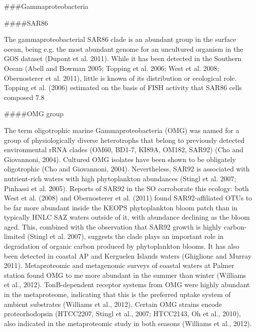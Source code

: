 ###Gammaproteobacteria

####SAR86

The gammaproteobacterial SAR86 clade is an abundant group in the surface ocean, being e.g. the most abundant genome for an uncultured organism in the GOS dataset (Dupont et al. 2011). While it has been detected in the Southern Ocean (Abell and Bowman 2005; Topping et al. 2006; West et al. 2008; Obernosterer et al. 2011), little is known of its distribution or ecological role. Topping et al. (2006) estimated on the basis of FISH activity that SAR86 cells composed 7.8%

####OMG group

The term oligotrophic marine Gammaproteobacteria (OMG) was named for a group of physiologically diverse heterotrophs that belong to previously detected environmental rRNA clades (OM60, BD1-7, KI89A, OM182, SAR92) (Cho and Giovannoni, 2004). Cultured OMG isolates have been shown to be obligately oligotrophic (Cho and Giovannoni, 2004). Nevertheless, SAR92 is associated with nutrient-rich waters with high phytoplankton abundances (Stingl et al. 2007; Pinhassi et al. 2005). Reports of SAR92 in the SO corroborate this ecology: both West et al. (2008) and Obernosterer et al. (2011) found SAR92-affiliated OTUs to be far more abundant inside the KEOPS phytoplankton bloom patch than in typically HNLC SAZ waters outside of it, with abundance declining as the bloom aged. This, combined with the observation that SAR92 growth is highly carbon-limited (Stingl et al. 2007), suggests the clade plays an important role in degradation of organic carbon produced by phytoplankton blooms. It has also been detected in coastal AP and Kerguelen Islands waters (Ghiglione and Murray 2011). Metaproteomic and metagenomic surveys of coastal waters at Palmer station found OMG to me more abundant in the summer than winter (Williams et al., 2012). TonB-dependent receptor systems from OMG were highly abundant in the metaproteome, indicating that this is the preferred uptake system of ambient substrates (Williams et al., 2012). Certain OMG strains encode proteorhodopsin (HTCC2207, Stingl et al., 2007; HTCC2143, Oh et al., 2010), also indicated in the metaproteomic study in both seasons (Williams et al., 2012).



